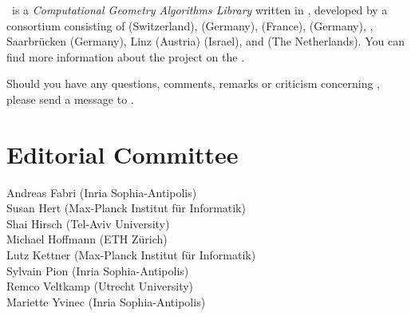 

\cgal\ is a {\em Computational Geometry Algorithms Library} written in \CC, 
developed by a consortium consisting of
 (Switzerland), 
 (Germany), 
 (France),
 (Germany),
,
Saarbr\"ucken (Germany),
 Linz (Austria)
 (Israel), and
 (The Netherlands). 
You can find more information about the project on the 
.

Should you have any questions, comments, remarks or criticism concerning 
\cgal, please send a message to 
.


\section*{Editorial Committee}

Andreas Fabri ({\sc Inria} Sophia-Antipolis) \\
Susan Hert (Max-Planck Institut f\"ur Informatik)\\
Shai Hirsch (Tel-Aviv University) \\
Michael Hoffmann (ETH Z\"urich) \\
Lutz Kettner (Max-Planck Institut f\"ur Informatik)\\ 
Sylvain Pion ({\sc Inria} Sophia-Antipolis)\\
Remco Veltkamp (Utrecht University)\\
Mariette Yvinec ({\sc Inria} Sophia-Antipolis)\\



